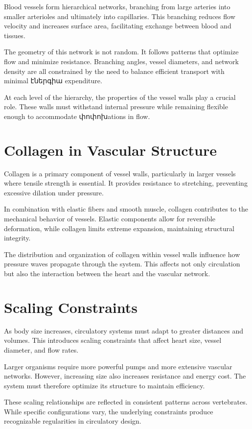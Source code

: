 \documentclass[11pt,oneside]{book}
\begin{document}
Blood vessels form hierarchical networks, branching from large arteries into smaller arterioles and ultimately into capillaries. This branching reduces flow velocity and increases surface area, facilitating exchange between blood and tissues.

The geometry of this network is not random. It follows patterns that optimize flow and minimize resistance. Branching angles, vessel diameters, and network density are all constrained by the need to balance efficient transport with minimal էներգիա expenditure.

At each level of the hierarchy, the properties of the vessel walls play a crucial role. These walls must withstand internal pressure while remaining flexible enough to accommodate փոփոխations in flow.

\section{Collagen in Vascular Structure}

Collagen is a primary component of vessel walls, particularly in larger vessels where tensile strength is essential. It provides resistance to stretching, preventing excessive dilation under pressure.

In combination with elastic fibers and smooth muscle, collagen contributes to the mechanical behavior of vessels. Elastic components allow for reversible deformation, while collagen limits extreme expansion, maintaining structural integrity.

The distribution and organization of collagen within vessel walls influence how pressure waves propagate through the system. This affects not only circulation but also the interaction between the heart and the vascular network.

\section{Scaling Constraints}

As body size increases, circulatory systems must adapt to greater distances and volumes. This introduces scaling constraints that affect heart size, vessel diameter, and flow rates.

Larger organisms require more powerful pumps and more extensive vascular networks. However, increasing size also increases resistance and energy cost. The system must therefore optimize its structure to maintain efficiency.

These scaling relationships are reflected in consistent patterns across vertebrates. While specific configurations vary, the underlying constraints produce recognizable regularities in circulatory design.
\end{document}

